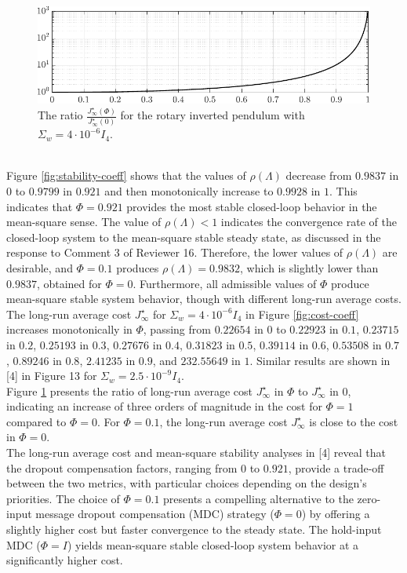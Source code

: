 {\begin{figure}[h!]
\begin{center}
\includegraphics[width=0.7\columnwidth]{./responses-rev-1/cost-ratio-2.pdf}
\caption{The ratio $\frac{J_{\infty}^{\star}(\mathit{\Phi})}{J_{\infty}^{\star}(\mathit{0})}$ for the rotary inverted pendulum with $\Sigma_{w}=4\cdot 10^{-6} I_4$.}\label{fig:cost-ratio}
\end{center}
\end{figure}\\[-4mm]
Figure \ref{fig:stability-coeff} shows that the values of $\rho(\Lambda)$ decrease from $0.9837$ in $0$ to $0.9799$ in $0.921$ and then monotonically increase to $0.9928$ in $1$. This indicates that $\mathit{\Phi} = 0.921$ provides the most stable closed-loop behavior in the mean-square sense. The value of $\rho(\Lambda)<1$ indicates the convergence rate of the closed-loop system to the mean-square stable steady state, as discussed in the response to Comment 3 of Reviewer 16. Therefore, the lower values of $\rho(\Lambda)$ are desirable, and $\mathit{\Phi} = 0.1$ produces $\rho(\Lambda)=0.9832$, which is slightly lower than $0.9837$, obtained for $\mathit{\Phi} = 0$. Furthermore, all admissible values of $\mathit{\Phi}$ produce mean-square stable system behavior, though with different long-run average costs.\\
The long-run average cost $J_{\infty}^{\star}$ for $\Sigma_{w}=4\cdot 10^{-6} I_4$ in Figure \ref{fig:cost-coeff} increases monotonically in $\mathit{\Phi}$, passing from $0.22654$ in $0$ to $0.22923$ in $0.1$, $0.23715$ in $0.2$, $0.25193$ in $0.3$, $0.27676$ in $0.4$,
$0.31823$ in $0.5$, $0.39114$ in $0.6$, $0.53508$ in $0.7$, $0.89246$ in $0.8$, 
$2.41235$ in $0.9$, and $232.55649$ in $1$. Similar results are shown in [4] in Figure 13 for $\Sigma_{w}=2.5\cdot 10^{-9} I_4$. \\
Figure \ref{fig:cost-ratio} presents the ratio of long-run average cost $J_{\infty}^{\star}$ in $\mathit{\Phi}$ to $J_{\infty}^{\star}$ in $0$, indicating an increase of three orders of magnitude in the cost for $\mathit{\Phi}=1$ compared to $\mathit{\Phi}=0$. For $\mathit{\Phi}=0.1$, the long-run average cost $J_{\infty}^{\star}$ is close to the cost in $\mathit{\Phi}=0$. \\
The long-run average cost and mean-square stability analyses in [4] reveal that the dropout compensation factors, ranging from $0$ to $0.921$, provide a trade-off between the two metrics, with particular choices depending on the design's priorities. The choice of $\mathit{\Phi} = 0.1$ presents a compelling alternative to the zero-input message dropout compensation (MDC) strategy ($\mathit{\Phi} = 0$) by offering a slightly higher cost but faster convergence to the steady state. The hold-input MDC ($\mathit{\Phi} = I$) yields mean-square stable closed-loop system behavior at a significantly higher cost. \\
}
